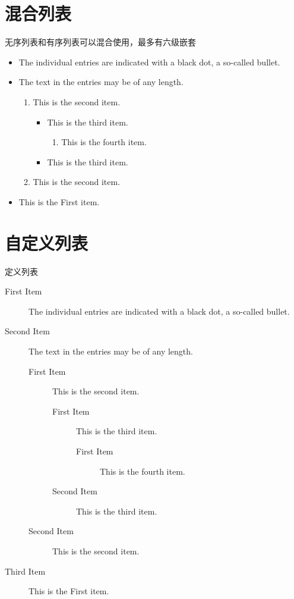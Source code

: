 \documentclass[a4paper, 12pt]{book}
\begin{document}
\section{混合列表}
无序列表和有序列表可以混合使用，最多有六级嵌套
\begin{itemize}
    \item The individual entries are indicated with a black dot, a so-called bullet.
    \item The text in the entries may be of any length.
        \begin{enumerate}
            \item This is the second item.
                \begin{itemize}
                    \item This is the third item.
                        \begin{enumerate}
                            \item This is the fourth item.
                        \end{enumerate}
                    \item This is the third item.
                \end{itemize}
            \item This is the second item.
        \end{enumerate}
    \item This is the First item.
\end{itemize}

\section{自定义列表}
定义列表
\begin{description}
    \item[First Item] The individual entries are indicated with a black dot, a so-called bullet.
    \item[Second Item] The text in the entries may be of any length.
        \begin{description}
            \item[First Item] This is the second item.
                \begin{description}
                    \item[First Item] This is the third item.
                        \begin{description}
                            \item[First Item] This is the fourth item.
                        \end{description}
                    \item[Second Item] This is the third item.
                \end{description}
            \item[Second Item] This is the second item.
        \end{description}
    \item[Third Item] This is the First item.
\end{description}
\end{document}
